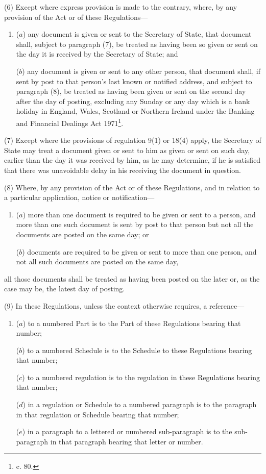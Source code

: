 \documentclass[a4paper,12pt]{article}
\begin{document}
(6) Except where express provision is made to the contrary, where, by any provision of the Act or of these Regulations—
\begin{enumerate}\item[]
($a$) any document is given or sent to the Secretary of State, that document shall, subject to paragraph (7), be treated as having been so given or sent on the day it is received by the Secretary of State; and

($b$) any document is given or sent to any 
other  %
person, that document shall, if sent by post to that person’s last known or notified address, and subject to paragraph (8), be treated as having been given or sent on the second day after the day of posting, excluding any Sunday or any day which is a bank holiday in England, Wales, Scotland or Northern Ireland under the Banking and Financial Dealings Act 1971\footnote{ c. 80.}.
\end{enumerate}

(7) Except where the provisions of regulation 
9(1) or 18(4)  %
apply, the Secretary of State may treat a document given or sent to him as given or sent on such day, earlier than the day it was received by him, as he may determine, if he is satisfied that there was unavoidable delay in his receiving the document in question.

(8) Where, by any provision of the Act or of these Regulations, and in relation to a particular application, notice or notification—
\begin{enumerate}\item[]
($a$) more than one document is required to be given or sent to a person, and more than one such document is sent by post to that person but not all the documents are posted on the same day; or

($b$) documents are required to be given or sent to more than one person, and not all such documents are posted on the same day,
\end{enumerate}
all those documents shall be treated as having been posted on the later or, as the case may be, the latest day of posting.

(9) In these Regulations, unless the context otherwise requires, a reference—
\begin{enumerate}\item[]
($a$) to a numbered Part is to the Part of these Regulations bearing that number;

($b$) to a numbered Schedule is to the Schedule to these Regulations bearing that number;

($c$) to a numbered regulation is to the regulation in these Regulations bearing that number;

($d$) in a regulation or Schedule to a numbered paragraph is to the paragraph in that regulation or Schedule bearing that number;

($e$) in a paragraph to a lettered or numbered sub-paragraph is to the sub-paragraph in that paragraph bearing that letter or number.
\end{enumerate}
\end{document}
